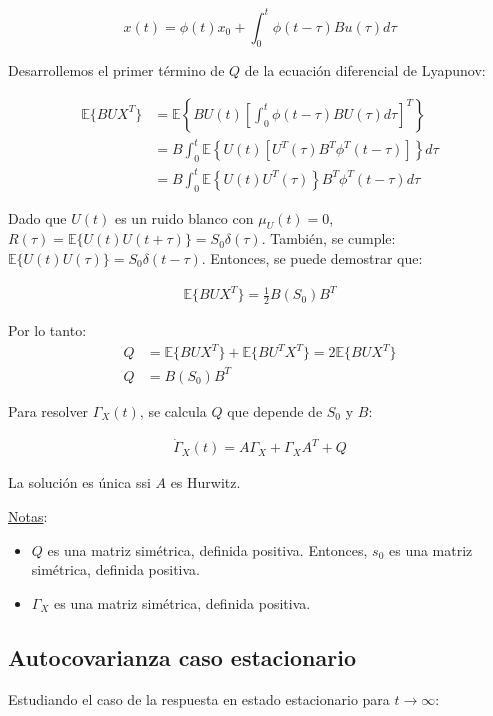 \begin{equation*}
    x(t)=\phi(t)x_0+\int_0^t \phi(t-\tau)Bu(\tau)d\tau
\end{equation*}

Desarrollemos el primer término de $Q$ de la ecuación diferencial de Lyapunov:

\begin{align*}
    \mathbb{E}\{BUX^T \} &=  \mathbb{E} \left\{ BU(t) \left[ \int_0^t \phi(t-\tau)B U(\tau) d\tau \right]^T \right\}\\
    &= B \int_0^t \mathbb{E} \left\{U(t) \left[U^T (\tau) B^T \phi^T (t-\tau) \right] \right\} d\tau\\
    &= B \int_0^t \mathbb{E} \left\{ U(t)U^T(\tau) \right\} B^T \phi^T (t-\tau) d\tau
\end{align*}

Dado que $U(t)$ es un ruido blanco con  $\mu_{U}(t)=0$, $R(\tau) = \mathbb{E}\{U(t)U(t +\tau)\} = S_0 \delta (\tau)$. También, se cumple: $\mathbb{E}\{U(t)U(\tau)\} = S_0 \delta (t-\tau)$. Entonces, se puede demostrar que:

\begin{align*}
    \mathbb{E}\{BUX^T \}=\frac{1}{2}B (S_0) B^T
\end{align*}

Por lo tanto:
\begin{align*}
    Q &= \mathbb{E}\{BUX^T \}+\mathbb{E}\{BU^T X^T \}=2\mathbb{E}\{BUX^T \}\\
    Q &= B(S_0)B^T
\end{align*}

Para resolver $\Gamma_X(t)$, se calcula $Q$ que depende de $S_0$ y $B$:

\begin{align*}
    \dot{\Gamma}_X(t)=A\Gamma_X+\Gamma_XA^T +Q
\end{align*}

La solución es única ssi $A$ es Hurwitz.\\

\par \underline{Notas}:
\begin{itemize}
    \item $Q$ es una matriz simétrica, definida positiva. Entonces, $s_0$ es una matriz simétrica, definida positiva.
    \item $\Gamma_X$ es una matriz simétrica, definida positiva.
\end{itemize}

\subsection{Autocovarianza caso estacionario}
Estudiando el caso de la respuesta en estado estacionario para $t \to \infty$:


